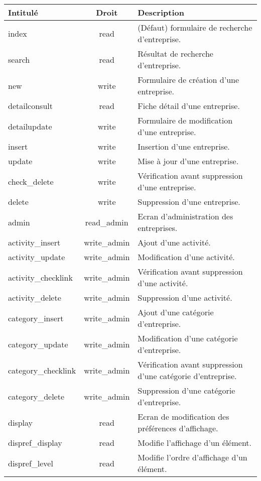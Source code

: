 \begin{tabular}{|l|c|p{9.5cm}|}
 \hline
 \textbf{Intitulé} & \textbf{Droit} & \textbf{Description} \\
 \hline
 \hline
  index & read & (Défaut) formulaire de recherche d'entreprise. \\ 
 \hline
  search & read & Résultat de recherche d'entreprise. \\
 \hline
  new & write & Formulaire de création d'une entreprise. \\
 \hline
  detailconsult & read & Fiche détail d'une entreprise. \\
 \hline
  detailupdate & write & Formulaire de modification d'une entreprise. \\
 \hline
  insert & write & Insertion d'une entreprise. \\
 \hline
  update & write & Mise à jour d'une entreprise. \\
 \hline
  check\_delete & write & Vérification avant suppression d'une entreprise. \\
 \hline
  delete & write & Suppression d'une entreprise. \\
 \hline
  admin & read\_admin & Ecran d'administration des entreprises. \\
 \hline
  activity\_insert & write\_admin & Ajout d'une activité. \\
 \hline
  activity\_update & write\_admin & Modification d'une activité. \\
 \hline
  activity\_checklink & write\_admin & Vérification avant suppression d'une activité. \\
 \hline
  activity\_delete & write\_admin & Suppression d'une activité. \\
 \hline
  category\_insert & write\_admin & Ajout d'une catégorie d'entreprise. \\
 \hline
  category\_update & write\_admin & Modification d'une catégorie d'entreprise. \\
 \hline
  category\_checklink & write\_admin & Vérification avant suppression d'une catégorie d'entreprise. \\
 \hline
  category\_delete & write\_admin & Suppression d'une catégorie d'entreprise. \\
 \hline
  display & read & Ecran de modification des préférences d'affichage. \\
 \hline
  dispref\_display & read & Modifie l'affichage d'un élément. \\
 \hline
  dispref\_level & read & Modifie l'ordre d'affichage d'un élément. \\

\end{tabular}
